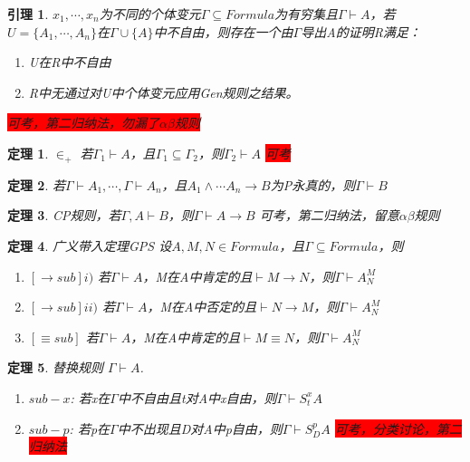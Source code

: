 \documentclass[a4paper]{ctexart}
\newtheorem{thm}{\hspace{2em}定理}[subsection]
\newtheorem{lem}{\hspace{2em}引理}
\newcommand{\shade}[1]{\colorbox{shadecolor}{#1}}
\newcommand{\redshade}[1]{\colorbox{red}{#1}}
\begin{document}
\begin{lem}
  $x_1,\cdots,x_n$为不同的个体变元$\Gamma\subseteq Formula$为有穷集且$\Gamma\vdash A$，若$U=\{A_1,\cdots,A_n\}$在$\Gamma\cup\{A\}$中不自由，则存在一个由$\Gamma$导出A的证明R满足：
  \begin{enumerate}[itemindent=2em]
    \item U在R中不自由
    \item R中无通过对U中个体变元应用Gen规则之结果。
  \end{enumerate}
  \redshade{可考，第二归纳法，勿漏了$\alpha\beta$规则}
\end{lem}

\begin{thm}
  $\in_+$ 若$\Gamma_1\vdash A$，且$\Gamma_1\subseteq\Gamma_2$，则$\Gamma_2\vdash A$ \redshade{可考}
\end{thm}

\begin{thm}
  若$\Gamma\vdash A_1,\cdots,\Gamma\vdash A_n$，且$A_1\wedge\cdots A_n\rightarrow B$为P永真的，则$\Gamma\vdash B$
\end{thm}

\begin{thm}
  CP规则，若$\Gamma,A\vdash B$，则$\Gamma\vdash A\rightarrow B$ \shade{可考，第二归纳法，留意$\alpha\beta$规则}
\end{thm}

\begin{thm}
  广义带入定理GPS 设$A,M,N\in Formula$，且$\Gamma\subseteq Formula$，则
  \begin{enumerate}[itemindent=2em]
    \item $[\rightarrow sub] i)$ 若$\Gamma\vdash A$，M在A中肯定的且$\vdash M\rightarrow N$，则$\Gamma\vdash A_N^M$
    \item $[\rightarrow sub] ii)$ 若$\Gamma\vdash A$，M在A中否定的且$\vdash N\rightarrow M$，则$\Gamma\vdash A_N^M$
    \item $[\equiv sub]$ 若$\Gamma\vdash A$，M在A中肯定的且$\vdash M\equiv N$，则$\Gamma\vdash A_N^M$
  \end{enumerate}
\end{thm}

\begin{thm}
  替换规则 $\Gamma\vdash A$.
  \begin{enumerate}
    \item $sub-x$: 若x在$\Gamma$中不自由且t对A中x自由，则$\Gamma\vdash S_t^xA$
    \item $sub-p$: 若p在$\Gamma$中不出现且D对A中p自由，则$\Gamma\vdash S_D^pA$ \redshade{可考，分类讨论，第二归纳法}
  \end{enumerate}
\end{thm}
\end{document}
